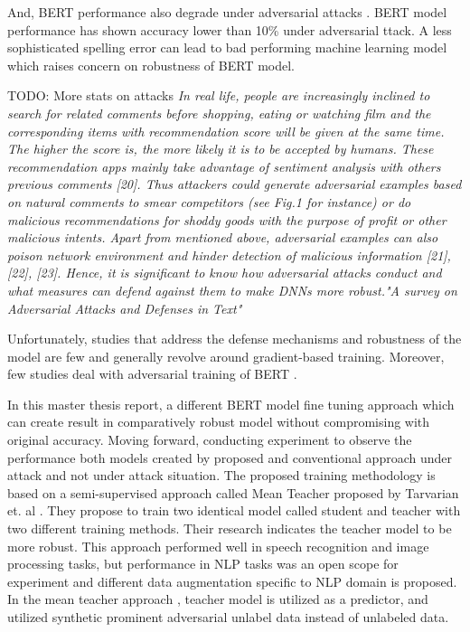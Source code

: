 \documentclass[%
	BCOR=8mm, %
	DIV=12, 
	toc=bibliography, %
	toc=listof, %
	oneside, %
	egregdoesnotlikesansseriftitles, %
	]{scrbook}
\begin{document}
And, BERT performance also degrade under adversarial attacks \cite{li_bert-attack_2020,garg_bae_2020}. BERT model performance has shown accuracy lower than 10\% under adversarial 
ttack. A less sophisticated spelling error can lead to bad performing machine learning model \cite{sun_adv-bert_2020} which raises concern on robustness of BERT model. 

TODO: More stats on attacks 
\textit{In real life, people are increasingly inclined to search for related comments before shopping, eating or watching film and the corresponding items with recommendation score will be 
given at the same time. The higher the score is, the more likely it is to be accepted by humans. These recommendation apps mainly take advantage of sentiment analysis with others previous
 comments [20]. Thus attackers could generate adversarial examples based on natural comments to smear competitors (see Fig.1 for instance) or do malicious recommendations for shoddy 
 goods with the purpose of profit or other malicious intents. Apart from mentioned above, adversarial examples can also poison network environment and hinder detection of malicious 
 information [21], [22], [23]. Hence, it is significant to know how adversarial attacks conduct and what measures can defend against them to make DNNs more robust."A survey on Adversarial 
 Attacks and Defenses in Text"}

Unfortunately, studies that address the defense mechanisms and robustness of the model are few and generally revolve around gradient-based training. Moreover, few studies deal with adversarial 
training of BERT \cite{zhu_at-bert_2021,du_adversarial_2020}. 

In this master thesis report, a different BERT model fine tuning approach which can create result in comparatively robust model without compromising with original accuracy. Moving forward, 
conducting experiment to observe the performance both models created by proposed and conventional approach  under attack and not under attack situation. The proposed training methodology 
is based on a semi-supervised approach called Mean Teacher proposed by Tarvarian et$.$ al \cite{tarvainen_mean_2018}. They propose to train two identical model called student and teacher  
with two different training methods. Their research indicates the teacher model to be more robust. This approach performed well in speech recognition and image processing tasks, but performance 
in NLP tasks was an open scope for experiment and different data augmentation specific to NLP domain is proposed. In the mean teacher approach , teacher model is utilized as a predictor, and
 utilized synthetic prominent adversarial unlabel data instead of unlabeled data.\\
 
\end{document}
